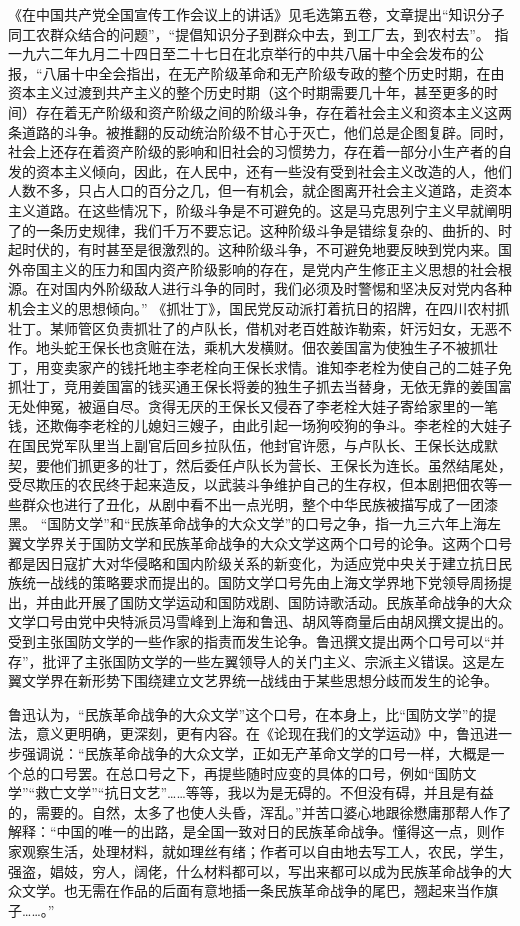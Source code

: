 \begin{maonote}
《在中国共产党全国宣传工作会议上的讲话》见毛选第五卷，文章提出“知识分子同工农群众结合的问题”，“提倡知识分子到群众中去，到工厂去，到农村去”。
指一九六二年九月二十四日至二十七日在北京举行的中共八届十中全会发布的公报，“八届十中全会指出，在无产阶级革命和无产阶级专政的整个历史时期，在由资本主义过渡到共产主义的整个历史时期（这个时期需要几十年，甚至更多的时间）存在着无产阶级和资产阶级之间的阶级斗争，存在着社会主义和资本主义这两条道路的斗争。被推翻的反动统治阶级不甘心于灭亡，他们总是企图复辟。同时，社会上还存在着资产阶级的影响和旧社会的习惯势力，存在着一部分小生产者的自发的资本主义倾向，因此，在人民中，还有一些没有受到社会主义改造的人，他们人数不多，只占人口的百分之几，但一有机会，就企图离开社会主义道路，走资本主义道路。在这些情况下，阶级斗争是不可避免的。这是马克思列宁主义早就阐明了的一条历史规律，我们千万不要忘记。这种阶级斗争是错综复杂的、曲折的、时起时伏的，有时甚至是很激烈的。这种阶级斗争，不可避免地要反映到党内来。国外帝国主义的压力和国内资产阶级影响的存在，是党内产生修正主义思想的社会根源。在对国内外阶级敌人进行斗争的同时，我们必须及时警惕和坚决反对党内各种机会主义的思想倾向。”
《抓壮丁》，国民党反动派打着抗日的招牌，在四川农村抓壮丁。某师管区负责抓壮了的卢队长，借机对老百姓敲诈勒索，奸污妇女，无恶不作。地头蛇王保长也贪赃在法，乘机大发横财。佃农姜国富为使独生子不被抓壮丁，用变卖家产的钱托地主李老栓向王保长求情。谁知李老栓为使自己的二娃子免抓壮丁，竞用姜国富的钱买通王保长将姜的独生子抓去当替身，无依无靠的姜国富无处伸冤，被逼自尽。贪得无厌的王保长又侵吞了李老栓大娃子寄给家里的一笔钱，还欺侮李老栓的儿媳妇三嫂子，由此引起一场狗咬狗的争斗。李老栓的大娃子在国民党军队里当上副官后回乡拉队伍，他封官许愿，与卢队长、王保长达成默契，要他们抓更多的壮丁，然后委任卢队长为营长、王保长为连长。虽然结尾处，受尽欺压的农民终于起来造反，以武装斗争维护自己的生存权，但本剧把佃农等一些群众也进行了丑化，从剧中看不出一点光明，整个中华民族被描写成了一团漆黑。
“国防文学”和“民族革命战争的大众文学”的口号之争，指一九三六年上海左翼文学界关于国防文学和民族革命战争的大众文学这两个口号的论争。这两个口号都是因日寇扩大对华侵略和国内阶级关系的新变化，为适应党中央关于建立抗日民族统一战线的策略要求而提出的。国防文学口号先由上海文学界地下党领导周扬提出，并由此开展了国防文学运动和国防戏剧、国防诗歌活动。民族革命战争的大众文学口号由党中央特派员冯雪峰到上海和鲁迅、胡风等商量后由胡风撰文提出的。受到主张国防文学的一些作家的指责而发生论争。鲁迅撰文提出两个口号可以“并存”，批评了主张国防文学的一些左翼领导人的关门主义、宗派主义错误。这是左翼文学界在新形势下围绕建立文艺界统一战线由于某些思想分歧而发生的论争。

鲁迅认为，“民族革命战争的大众文学”这个口号，在本身上，比“国防文学”的提法，意义更明确，更深刻，更有内容。在《论现在我们的文学运动》中，鲁迅进一步强调说：“民族革命战争的大众文学，正如无产革命文学的口号一样，大概是一个总的口号罢。在总口号之下，再提些随时应变的具体的口号，例如“国防文学”“救亡文学”“抗日文艺”……等等，我以为是无碍的。不但没有碍，并且是有益的，需要的。自然，太多了也使人头昏，浑乱。”并苦口婆心地跟徐懋庸那帮人作了解释：“中国的唯一的出路，是全国一致对日的民族革命战争。懂得这一点，则作家观察生活，处理材料，就如理丝有绪；作者可以自由地去写工人，农民，学生，强盗，娼妓，穷人，阔佬，什么材料都可以，写出来都可以成为民族革命战争的大众文学。也无需在作品的后面有意地插一条民族革命战争的尾巴，翘起来当作旗子……。”


\end{maonote}
